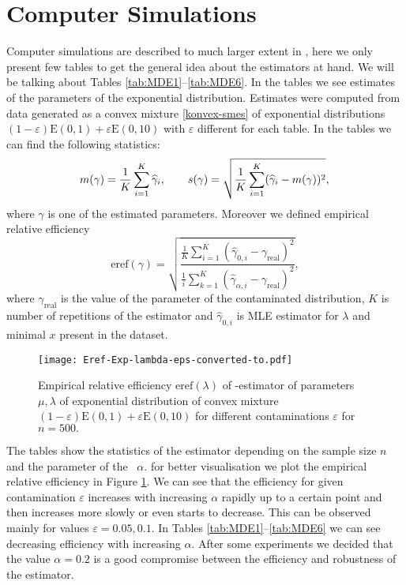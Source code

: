 \section{Computer Simulations}
Computer simulations are described to much larger extent in \cite{Kucera2012}, here we only present few tables to get the general idea about the estimators at hand. We will be talking about Tables \ref{tab:MDE1}--\ref{tab:MDE6}. In the tables we see estimates of the parameters of the exponential distribution. Estimates were computed from data generated as a convex mixture \ref{konvex-smes} of exponential distributions $(1-\varepsilon)\mathrm{E}(0,1) + \varepsilon\mathrm{E}(0,10)$  with $\varepsilon$ different for each table. In the tables we can find the following statistics:
\begin{equation}
	m(\gamma) = \frac{1}{K}\sum_{i=1}^K \widehat{\gamma}_{i}, \qquad s(\gamma) = \sqrt{\frac{1}{K}\sum_{i=1}^K (\widehat{\gamma}_{i}-{m(\gamma)})^2},\\
	\label{stat1}
\end{equation}
where $\gamma $ is one of the estimated parameters. Moreover we defined empirical relative efficiency 
\begin{equation}
	\mathrm{eref}(\gamma) = \sqrt{\dfrac{\frac{1}{K}\sum_{i=1}^K (\widehat{\gamma}_{\mathrm{0} ,i} - \gamma_{\mathrm{real}})^2}{\frac{1}{i}\sum_{k=1}^K (\widehat{\gamma}_{\alpha,i} - \gamma_{\mathrm{real}})^2}},
	\label{stat2}
\end{equation}
where $\gamma_\mathrm{real}$ is the value of the parameter of the contaminated distribution,  $K$ is number of repetitions of the estimator and $\widehat{\gamma}_{0,i}$ is MLE estimator for $\lambda$ and minimal $x$ present in the dataset.
\begin{figure}[htb]
\centering
\texttt{[image: Eref-Exp-lambda-eps-converted-to.pdf]}
\caption{Empirical relative efficiency $\mathrm{eref}(\lambda)$ of \mRa-estimator of parameters $\mu, \lambda$ of exponential distribution of convex mixture $(1-\varepsilon)\mathrm{E}(0,1) + \varepsilon\mathrm{E}(0,10)$ for different contaminations $\varepsilon$ for $n=500.$}
\label{fig:eref}
\end{figure}

The tables show the statistics of the estimator depending on the sample size $n$ and the parameter of the \mRao\ $\alpha$. for better visualisation we plot the empirical relative efficiency in Figure \ref{fig:eref}. We can see that the efficiency for given contamination $\varepsilon$ increases with increasing $\alpha$ rapidly up to a certain point and then increases more slowly or even starts to decrease. This can be observed mainly for values $\varepsilon=0.05, 0.1$. In Tables \ref{tab:MDE1}--\ref{tab:MDE6} we can see decreasing efficiency with increasing  $\alpha$. After some experiments we decided that the value $\alpha = 0.2 $ is a good compromise between the efficiency and robustness of the estimator.






 